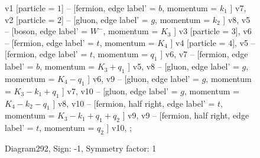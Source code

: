 \documentclass{revtex4}
\begin{document}
\begin{figure}[!htb]
\begin{center}
{    %
v1 [particle = \(1\)] -- [fermion, edge label' = \(b\), momentum = \(k_{1}\) ] v7, 
v2 [particle = \(2\)] -- [gluon, edge label' = \(g\), momentum = \(k_{2}\) ] v8, 
v5 -- [boson, edge label' = \(W^{-}\), momentum = \(K_{3}\) ] v3 [particle = \(3\)], 
v6 -- [fermion, edge label' = \(t\), momentum = \(K_{4}\) ] v4 [particle = \(4\)], 
v5 -- [fermion, edge label' = \(t\), momentum = \(q_{1}\) ] v6, 
v7 -- [fermion, edge label' = \(b\), momentum = \(K_{3} + q_{1}\) ] v5, 
v8 -- [gluon, edge label' = \(g\), momentum = \(K_{4} - q_{1}\) ] v6, 
v9 -- [gluon, edge label' = \(g\), momentum = \(K_{3} - k_{1} + q_{1}\) ] v7, 
v10 -- [gluon, edge label' = \(g\), momentum = \(K_{4} - k_{2} - q_{1}\) ] v8, 
v10 -- [fermion, half right, edge label' = \(t\), momentum = \(K_{3} - k_{1} + q_{1} + q_{2}\) ] v9, 
v9 -- [fermion, half right, edge label' = \(t\), momentum = \(q_{2}\) ] v10, 
};
\end{center}
\caption{Diagram292, Sign: -1, Symmetry factor: 1}
\end{figure}
\newpage
\end{document}
